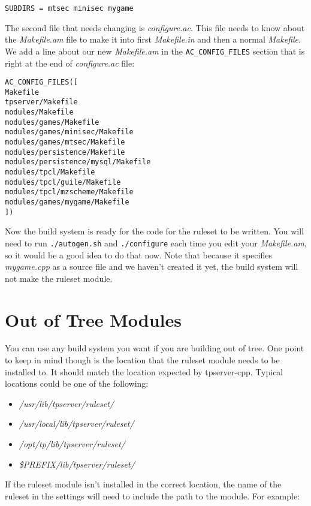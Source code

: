 \documentclass[a4paper,11pt]{report}
\newcommand{\filename}[1]{\emph{#1}}
\newcommand{\codename}[1]{\texttt{#1}}
\begin{document}
\begin{verbatim}
SUBDIRS = mtsec minisec mygame
\end{verbatim}

The second file that needs changing is \filename{configure.ac}. This file needs to know about the \filename{Makefile.am} file to make it into first \filename{Makefile.in} and then a normal \filename{Makefile}. We add a line about our new \filename{Makefile.am} in the \codename{AC\_CONFIG\_FILES} section that is right at the end of \filename{configure.ac} file:

\begin{verbatim}
AC_CONFIG_FILES([
Makefile
tpserver/Makefile
modules/Makefile
modules/games/Makefile
modules/games/minisec/Makefile
modules/games/mtsec/Makefile
modules/persistence/Makefile
modules/persistence/mysql/Makefile
modules/tpcl/Makefile
modules/tpcl/guile/Makefile
modules/tpcl/mzscheme/Makefile
modules/games/mygame/Makefile
]) 
\end{verbatim}

Now the build system is ready for the code for the ruleset to be written. You will need to run \codename{./autogen.sh} and \codename{./configure} each time you edit your \filename{Makefile.am}, so it would be a good idea to do that now. Note that because it specifies \filename{mygame.cpp} as a source file and we haven't created it yet, the build system will not make the ruleset module.

\section{Out of Tree Modules}
\label{sec:outoftree-module-build}

You can use any build system you want if you are building out of tree. One point to keep in mind though is the location that the ruleset module needs to be installed to. It should match the location expected by tpserver-cpp. Typical locations could be one of the following:
\begin{itemize}
 \item \filename{/usr/lib/tpserver/ruleset/}
 \item \filename{/usr/local/lib/tpserver/ruleset/}
 \item \filename{/opt/tp/lib/tpserver/ruleset/}
 \item \filename{\$PREFIX/lib/tpserver/ruleset/}
\end{itemize}

If the ruleset module isn't installed in the correct location, the name of the ruleset in the settings will need to include the path to the module. For example:
\end{document}
